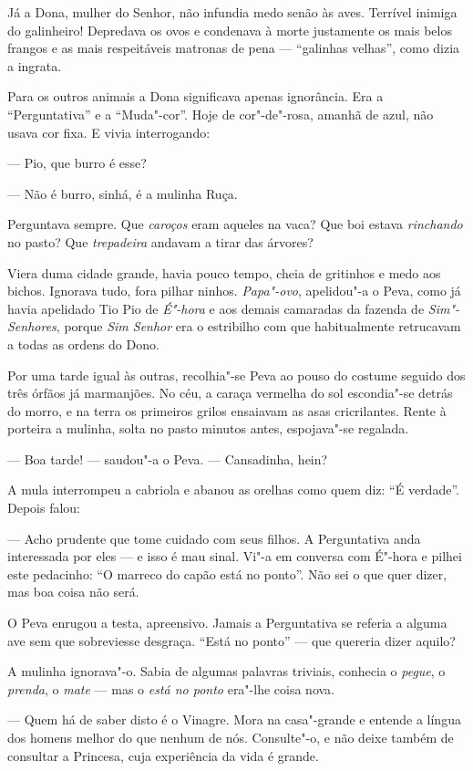 Já a Dona, mulher do Senhor, não infundia medo senão às aves. Terrível
inimiga do galinheiro! Depredava os ovos e condenava à morte justamente
os mais belos frangos e as mais respeitáveis matronas de pena ---
``galinhas velhas'', como dizia a ingrata.

Para os outros animais a Dona significava apenas ignorância. Era a
``Perguntativa'' e a ``Muda"-cor''. Hoje de cor"-de"-rosa, amanhã de azul,
não usava cor fixa. E vivia interrogando:

--- Pio, que burro é esse?

--- Não é burro, sinhá, é a mulinha Ruça.

Perguntava sempre. Que \emph{caroços} eram aqueles na vaca? Que boi
estava \emph{rinchando} no pasto? Que \emph{trepadeira} andavam a tirar
das árvores?

Viera duma cidade grande, havia pouco tempo, cheia de gritinhos e medo
aos bichos. Ignorava tudo, fora pilhar ninhos. \emph{Papa"-ovo},
apelidou"-a o Peva, como já havia apelidado Tio Pio de \emph{É"-hora} e
aos demais camaradas da fazenda de \emph{Sim"-Senhores}, porque \emph{Sim
Senhor} era o estribilho com que habitualmente retrucavam a todas as
ordens do Dono.

Por uma tarde igual às outras, recolhia"-se Peva ao pouso do costume
seguido dos três órfãos já marmanjões. No céu, a caraça vermelha do sol
escondia"-se detrás do morro, e na terra os primeiros grilos ensaiavam as
asas cricrilantes. Rente à porteira a mulinha, solta no pasto minutos
antes, espojava"-se regalada.

--- Boa tarde! --- saudou"-a o Peva. --- Cansadinha, hein?

A mula interrompeu a cabriola e abanou as orelhas como quem diz: ``É
verdade''. Depois falou:

--- Acho prudente que tome cuidado com seus filhos. A Perguntativa anda
interessada por eles --- e isso é mau sinal. Vi"-a em conversa com É"-hora
e pilhei este pedacinho: ``O marreco do capão está no ponto''. Não sei o
que quer dizer, mas boa coisa não será.

O Peva enrugou a testa, apreensivo. Jamais a Perguntativa se referia a
alguma ave sem que sobreviesse desgraça. ``Está no ponto'' --- que
quereria dizer aquilo?

A mulinha ignorava"-o. Sabia de algumas palavras triviais, conhecia o
\emph{pegue}, o \emph{prenda}, o \emph{mate} --- mas o \emph{está no
ponto} era"-lhe coisa nova.

--- Quem há de saber disto é o Vinagre. Mora na casa"-grande e entende a
língua dos homens melhor do que nenhum de nós. Consulte"-o, e não deixe
também de consultar a Princesa, cuja experiência da vida é grande.

